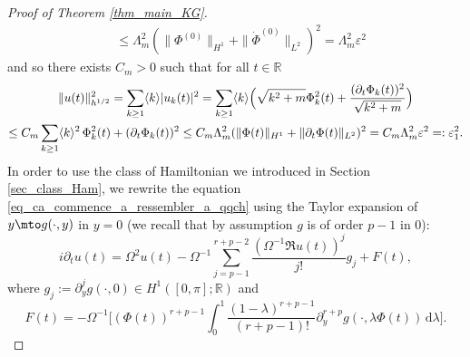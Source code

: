 \begin{proof}[Proof of Theorem \ref{thm_main_KG}]
\begin{equation*}
\begin{split}
&\leq \Lambda_m^2 (\|\Phi^{(0)}\|_{H^1} +\|\dot{\Phi}^{(0)}\|_{ L^2})^2 = \Lambda_m^2 \varepsilon^2
\end{split}
\end{equation*}
and so there exists $C_m>0$ such that for all $t\in \mathbb{R}$
\begin{multline*}
\|u(t)\|_{h^{1/2}}^2 = \sum_{k\geq 1} \langle k \rangle |u_k(t)|^2 = \sum_{k\geq 1} \langle k \rangle \Bigl(\sqrt{k^2+m} \Phi_k^2(t) + \frac{(\partial_t \Phi_k(t))^2}{ \sqrt{k^2+m} } \Bigr) \\
\leq C_m \sum_{k\geq 1} \langle k \rangle^2 \, \Phi_k^2(t) + (\partial_t \Phi_k(t))^2 \leq C_m\Lambda_m^2 (\| \Phi(t) \|_{H^1} + \| \partial_t \Phi(t) \|_{L^2})^2= C_m\Lambda_m^2 \varepsilon^2 =:\varepsilon_1^2.
\end{multline*}
In order to use the class of Hamiltonian we introduced in Section \ref{sec_class_Ham},
we rewrite the equation \eqref{eq_ca_commence_a_ressembler_a_qqch} using the Taylor expansion of $y\mto g(\cdot,y)$ in $y=0$ (we recall that by assumption $g$ is of order $p-1$ in $0$):
\begin{equation}
\label{eq_ca_ressemble_presque_a_qqch}
i\partial_t u(t) = \Omega^2 u(t) - \Omega^{-1} \sum_{j=p-1}^{r+p-2} \frac{(\Omega^{-1} \Re u(t))^j}{j !} g_j + F(t),
\end{equation}
where $g_j:= \partial_{y}^{j} g(\cdot,0) \in H^1([0,\pi];\mathbb{R})$ and
\[
F(t) = -\Omega^{-1} \biggl[(\Phi(t))^{r+p-1} \int_0^1 \frac{(1-\lambda)^{r+p-1}}{(r+p-1)!} \partial_{y}^{r+p} g(\cdot,\lambda \Phi(t)) \, \mathrm{d}\lambda \biggr].
\]


\end{proof}
